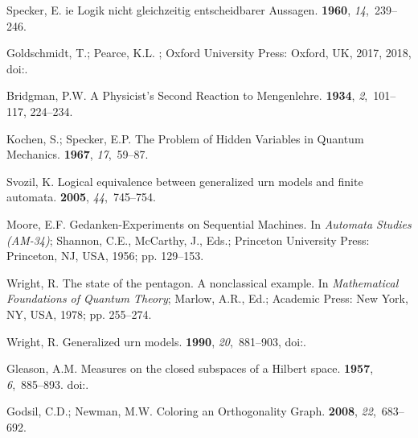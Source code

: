 \begin{thebibliography}{999}
Specker, E.
ie {L}ogik nicht gleichzeitig entscheidbarer {A}ussagen.
 {\bf 1960}, {\em 14},~239--246.

Goldschmidt, T.; Pearce, K.L.
; Oxford University Press:
 Oxford, UK,  2017, 2018,
\newblock
 doi:{\href{https://doi.org/10.1093/oso/9780198746973.001.0001}{}}.

Bridgman, P.W.
\newblock A Physicist's Second Reaction to {M}engenlehre.
 {\bf 1934}, {\em 2},~101--117, 224--234.

Kochen, S.; Specker, E.P.
\newblock The Problem of Hidden Variables in Quantum Mechanics.
 {\bf 1967}, {\em 17},~59--87.

Svozil, K.
\newblock Logical equivalence between generalized urn models and finite
 automata.
 {\bf 2005}, {\em
 44},~745--754.

Moore, E.F.
\newblock Gedanken-Experiments on Sequential Machines. In {\em Automata
 Studies {(AM-34)}}; Shannon, C.E., McCarthy, J., Eds.; Princeton University
 Press: Princeton, NJ, USA, 1956; pp. 129--153.

Wright, R.
\newblock The state of the pentagon. {A} nonclassical example. In {\em
 Mathematical Foundations of Quantum Theory}; Marlow, A.R., Ed.; Academic
 Press: New York, NY, USA, 1978; pp. 255--274.

Wright, R.
\newblock Generalized urn models.
 {\bf 1990}, {\em 20},~881--903,
\newblock
 doi:{\href{https://doi.org/10.1007/BF01889696}{}}.

Gleason, A.M.
\newblock Measures on the closed subspaces of a {H}ilbert space.
 {\bf 1957}, {\em 6},~885--893.
\newblock
 doi:{\href{https://doi.org/10.1512/iumj.1957.6.56050}{}}.

Godsil, C.D.; Newman, M.W.
\newblock Coloring an Orthogonality Graph.
 {\bf 2008}, {\em
 22},~683--692.


\end{thebibliography}
